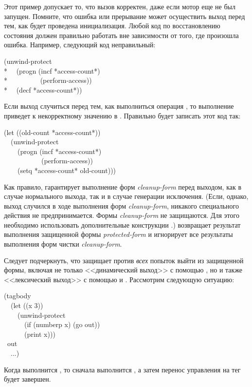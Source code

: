 \begin{defspec}
Этот пример допускает то, что вызов  корректен, даже если
мотор еще не был запущен. Помните, что ошибка или прерывание может осуществить
выход перед тем, как будет проведена инициализация. Любой код по восстановлению
состояния должен правильно работать вне зависимости от того, где произошла
ошибка.
Например, следующий код неправильный:
\begin{lisp}
(unwind-protect \\*
~~(progn (incf *access-count*) \\*
~~~~~~~~~(perform-access)) \\*
~~(decf *access-count*))
\end{lisp}
Если выход случиться перед тем, как выполниться операция , то
выполнение  приведет к некорректному значению в .
Правильно будет записать этот код так:
\begin{lisp}
(let ((old-count *access-count*)) \\
~~(unwind-protect \\
~~~~(progn (incf *access-count*) \\
~~~~~~~~~~~(perform-access)) \\
~~~~(setq *access-count* old-count)))
\end{lisp}

Как правило,  гарантирует выполнение форм
\emph{cleanup-form} перед выходом, как в случае нормального выхода, так и в
случае генерации исключения.
(Если, однако, выход случился в ходе выполнения форм \emph{cleanup-form},
никакого специального действия не предпринимается. Формы \emph{cleanup-form} не
защищаются. Для этого необходимо использовать дополнительные
конструкции .)
 возвращает результат выполнения защищенной формы
\emph{protected-form} и игнорирует все результаты выполнения форм чистки
\emph{cleanup-form}.

Следует подчеркнуть, что  защищает против \emph{всех}
попыток выйти из защищенной формы, включая не только <<динамический выход>> с
помощью , но и также <<лексический выход>> с помощью  и
. Рассмотрим следующую ситуацию:
\begin{lisp}
(tagbody \\
~~(let ((x 3)) \\
~~~~(unwind-protect \\
~~~~~~(if (numberp x) (go out)) \\
~~~~~~(print x))) \\
~out \\
~~...)
\end{lisp}
Когда выполнится , то сначала выполнится , а затем перенос управления
на тег  будет завершен.
\end{defspec}

